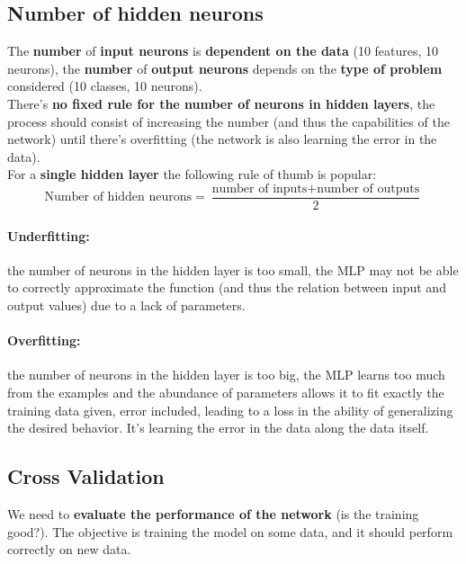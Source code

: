 \subsection{Number of hidden neurons}
The \textbf{number} of \textbf{input neurons} is \textbf{dependent on the data} (10 features, 10 neurons), the \textbf{number} of \textbf{output neurons} depends on the \textbf{type of problem} considered (10 classes, 10 neurons).\\

There's \textbf{no fixed rule for the number of neurons in hidden layers}, the process should consist of increasing the number (and thus the capabilities of the network) until there's overfitting (the network is also learning the error in the data).\\

For a \textbf{single hidden layer} the following rule of thumb is popular: 
$$ \text{Number of hidden neurons} = \frac{\text{number of inputs} + \text{number of outputs}}{2}$$

\paragraph{Underfitting:} the number of neurons in the hidden layer is too small, the MLP may not be able to correctly approximate the function (and thus the relation between input and output values) due to a lack of parameters.\\

\paragraph{Overfitting:} the number of neurons in the hidden layer is too big, the MLP learns too much from the examples and the abundance of parameters allows it to fit exactly the training data given, error included, leading to a loss in the ability of generalizing the desired behavior. It's learning the error in the data along the data itself.\\

\newpage

\subsection{Cross Validation}
We need to \textbf{evaluate the performance of the network} (is the training good?). The objective is training the model on some data, and it should perform correctly on new data. \\

